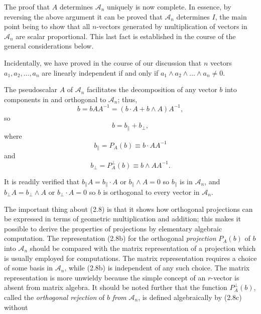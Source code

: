 \documentclass[fleqn]{scrartcl}
\numberwithin{equation}{section}
\begin{document}
\vspace{1em}
\noindent The proof that \(A\) determines \(\mathscr{A}_n\) uniquely is now complete. In essence, by reversing the above argument it can be proved that \(\mathscr{A}_n\) determines \(I\), the main point being to show that all \(n\)-vectors generated by multiplication of vectors in \(\mathscr{A}_n\) are scalar proportional. This last fact is established in the course of the general considerations below.

\vspace{1em}
\noindent Incidentally, we have proved in the course of our discussion that \(n\) vectors \(a_1, a_2, \dots, a_n\) are linearly independent if and only if \(a_1 \wedge a_2 \wedge \dots \wedge a_n \neq 0\).

\vspace{1em}
\noindent The pseudoscalar \(A\) of \(\mathscr{A}_n\) facilitates the decomposition of any vector \(b\) into components in and orthogonal to \(\mathscr{A}_n\); thus,
\[
b = b A A^{-1} = (b \cdot A + b \wedge A) A^{-1},
\]
so
\begin{equation}
b = b_\parallel + b_\perp, \tag{2.8a}
\end{equation}
where
\begin{equation}
b_\parallel = P_A(b) \equiv b \cdot A A^{-1} \tag{2.8b}
\end{equation}
and
\begin{equation}
b_\perp = P_A^\perp(b) \equiv b \wedge A A^{-1}. \tag{2.8c}
\end{equation}

\noindent It is readily verified that \(b_\parallel A = b_\parallel \cdot A\) or \(b_\parallel \wedge A = 0\) so \(b_\parallel\) is in \(\mathscr{A}_n\), and \(b_\perp A = b_\perp \wedge A\) or \(b_\perp \cdot A = 0\) so \(b\) is orthogonal to every vector in \(\mathscr{A}_n\).

\vspace{1em}
\noindent The important thing about (2.8) is that it shows how orthogonal projections can be expressed in terms of geometric multiplication and addition; this makes it possible to derive the properties of projections by elementary algebraic computation. The representation (2.8b) for the orthogonal \textit{projection} \(P_A(b)\) of \(b\) into \(\mathscr{A}_n\) should be compared with the matrix representation of a projection which is usually employed for computations. The matrix representation requires a choice of some basis in \(\mathscr{A}_n\), while (2.8b) is independent of any such choice. The matrix representation is more unwieldy because the simple concept of an \(r\)-vector is absent from matrix algebra. It should be noted further that the function \(P_A^\perp(b)\), called the \textit{orthogonal rejection} of \(b\) \textit{from} \(\mathscr{A}_n\), is defined algebraically by (2.8c) without
\end{document}
